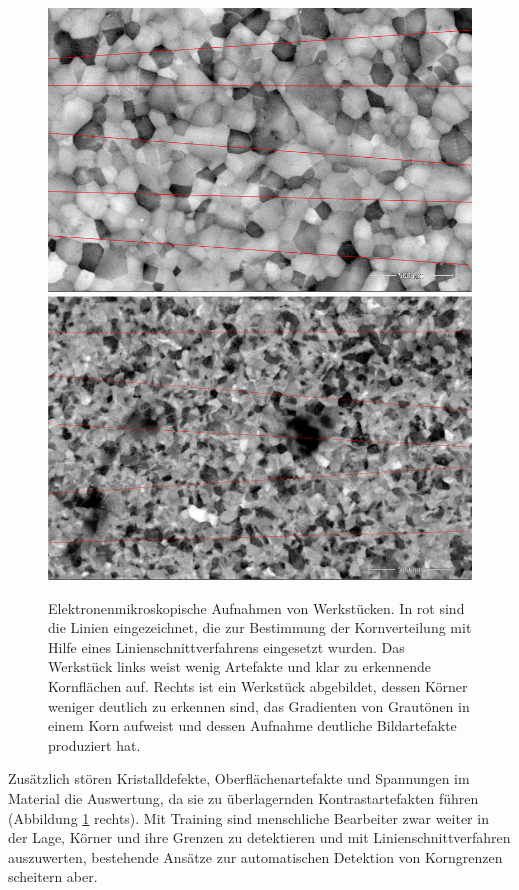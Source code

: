 \documentclass[
  12pt,
  openany]{book}
\begin{document}
\begin{figure}

{\centering \includegraphics[width=.45\textwidth]{../imgs/out1} \includegraphics[width=.45\textwidth]{../imgs/out2} 

}

\caption[Elektronenmikroskopische Aufnahmen von Werkstücken.]{Elektronenmikroskopische Aufnahmen von Werkstücken. In rot sind die Linien eingezeichnet, die zur Bestimmung der Kornverteilung mit Hilfe eines Linienschnittverfahrens eingesetzt wurden. Das Werkstück links weist wenig Artefakte und klar zu erkennende Kornflächen auf. Rechts ist ein Werkstück abgebildet, dessen Körner weniger deutlich zu erkennen sind, das Gradienten von Grautönen in einem Korn aufweist und dessen Aufnahme deutliche Bildartefakte produziert hat.}\label{fig:electroGrain}
\end{figure}

Zusätzlich stören Kristalldefekte, Oberflächenartefakte und Spannungen im Material die Auswertung, da sie zu überlagernden Kontrastartefakten führen (Abbildung \ref{fig:electroGrain} rechts).
Mit Training sind menschliche Bearbeiter zwar weiter in der Lage, Körner und ihre Grenzen zu detektieren und mit Linienschnittverfahren auszuwerten, bestehende Ansätze zur automatischen Detektion von Korngrenzen scheitern aber.
\end{document}
